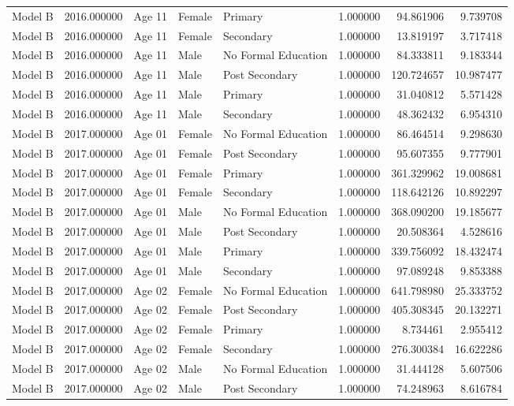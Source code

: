 \begin{table}[ht]
\begin{tabular}{lrlllrrr}
Model B & 2016.000000 & Age 11 & Female & Primary & 1.000000 & 94.861906 & 9.739708 \\
Model B & 2016.000000 & Age 11 & Female & Secondary & 1.000000 & 13.819197 & 3.717418 \\
Model B & 2016.000000 & Age 11 & Male & No Formal Education & 1.000000 & 84.333811 & 9.183344 \\
Model B & 2016.000000 & Age 11 & Male & Post Secondary & 1.000000 & 120.724657 & 10.987477 \\
Model B & 2016.000000 & Age 11 & Male & Primary & 1.000000 & 31.040812 & 5.571428 \\
Model B & 2016.000000 & Age 11 & Male & Secondary & 1.000000 & 48.362432 & 6.954310 \\
Model B & 2017.000000 & Age 01 & Female & No Formal Education & 1.000000 & 86.464514 & 9.298630 \\
Model B & 2017.000000 & Age 01 & Female & Post Secondary & 1.000000 & 95.607355 & 9.777901 \\
Model B & 2017.000000 & Age 01 & Female & Primary & 1.000000 & 361.329962 & 19.008681 \\
Model B & 2017.000000 & Age 01 & Female & Secondary & 1.000000 & 118.642126 & 10.892297 \\
Model B & 2017.000000 & Age 01 & Male & No Formal Education & 1.000000 & 368.090200 & 19.185677 \\
Model B & 2017.000000 & Age 01 & Male & Post Secondary & 1.000000 & 20.508364 & 4.528616 \\
Model B & 2017.000000 & Age 01 & Male & Primary & 1.000000 & 339.756092 & 18.432474 \\
Model B & 2017.000000 & Age 01 & Male & Secondary & 1.000000 & 97.089248 & 9.853388 \\
Model B & 2017.000000 & Age 02 & Female & No Formal Education & 1.000000 & 641.798980 & 25.333752 \\
Model B & 2017.000000 & Age 02 & Female & Post Secondary & 1.000000 & 405.308345 & 20.132271 \\
Model B & 2017.000000 & Age 02 & Female & Primary & 1.000000 & 8.734461 & 2.955412 \\
Model B & 2017.000000 & Age 02 & Female & Secondary & 1.000000 & 276.300384 & 16.622286 \\
Model B & 2017.000000 & Age 02 & Male & No Formal Education & 1.000000 & 31.444128 & 5.607506 \\
Model B & 2017.000000 & Age 02 & Male & Post Secondary & 1.000000 & 74.248963 & 8.616784 \\

\end{tabular}
\end{table}
